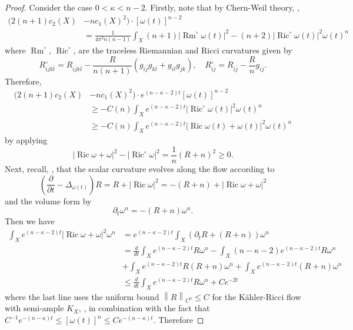 \documentclass[12pt]{article}
\numberwithin{equation}{section}
\renewcommand{\d}{\partial}
\DeclareMathOperator{\Ric}{Ric}
\DeclareMathOperator{\Rm}{Rm}
\newcommand{\oo}[1]{\overline{#1}}
\newcommand{\parabolic}[1]{\left(\frac{\d}{\d t} - \Delta_{#1}\right)}
\newcommand{\norm}[1]{\left\|#1\right\|}
\begin{document}
\begin{proof}
Consider the case $0 < \kappa < n-2$. Firstly, note that by Chern-Weil theory, \cite{B87,K14},
\begin{align*}
    (2 (n+1) c_2(X) &- n c_1(X)^2) \cdot [\omega(t)]^{n-2}\\
    &= \frac{1}{4 \pi^2 n(n-1)}\int_X (n+1)|\Rm^\circ\omega(t)|^2 - (n+2)|\Ric^\circ\omega(t)|^2 \omega(t)^n
\end{align*}
where $\Rm^\circ$, $\Ric^\circ$, are the traceless Riemannian and Ricci curvatures given by
\begin{equation*}
    R^\circ_{i\oo{j}k\oo{l}} = R_{i\oo{j}k\oo{l}} - \frac{R}{n(n+1)}(g_{i\oo{j}}g_{k\oo{l}} + g_{i\oo{l}}g_{j\oo{k}}), \quad R^\circ_{i\oo{j}} = R_{i\oo{j}} - \frac{R}{n} g_{i\oo{j}}.
\end{equation*}
Therefore,
\begin{align*}
    (2 (n+1) c_2(X) &- n c_1(X)^2) \cdot e^{(n-\kappa-2)t}[\omega(t)]^{n-2}\\ &\geq -C(n)\int_X e^{(n-\kappa-2)t} |\Ric^\circ \omega(t)|^2 \omega(t)^n\\
    &\geq -C(n) \int_X e^{(n-\kappa-2)t}|\Ric \omega(t) + \omega(t)|^2 \omega(t)^n
\end{align*}
by applying
\begin{equation*}
    |\Ric \omega + \omega|^2  - |\Ric^\circ \omega|^2 = \frac{1}{n}(R + n)^2 \geq 0.  
\end{equation*}
Next, recall, \cite{Z09}, that the scalar curvature evolves along the flow according to
\begin{equation*}
    \parabolic{\omega(t)} R = R + |\Ric \omega|^2 = -(R+n) + |\Ric \omega + \omega|^2
\end{equation*}
and the volume form by
\begin{equation*}
    \d_t \omega^n = -(R+n)\omega^n.
\end{equation*}
Then we have
\begin{align*}
    \int_X e^{(n-\kappa-2)t}|\Ric \omega + \omega|^2 \omega^n
    &= e^{(n-\kappa-2)t} \int_X  (\d_t R +(R+n))\omega^n\\
    &= \frac{d}{dt} \int_X e^{(n-\kappa-2)t} R \omega^n - \int_X (n-\kappa-2) e^{(n-\kappa-2)t}R \omega^n\\
    &+ \int_X e^{(n-\kappa-2)t}R(R+n)\omega^n + \int_X e^{(n-\kappa-2)t} (R+n) \omega^n\\
    &\leq \frac{d}{dt} \int_X e^{(n-\kappa-2)t} R \omega^n  + Ce^{-2t}
\end{align*}
where the last line uses the uniform bound $\norm{R}_{C^0} \leq C$ for the K\"ahler-Ricci flow with semi-ample $K_X$, \cite{ST16}, in combination with the fact that $C^{-1} e^{-(n-\kappa)t} \leq [\omega(t)]^n \leq C e^{-(n-\kappa)t}$. Therefore

\end{proof}
\end{document}
